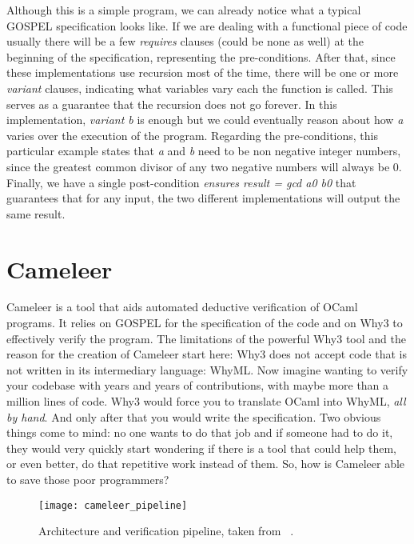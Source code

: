 Although this is a simple program, we can already notice what a typical GOSPEL specification looks like.
If we are dealing with a functional piece of code usually there will be a few \emph{requires} clauses (could be none as well) at the beginning of the specification, representing the pre-conditions.
After that, since these implementations use recursion most of the time, there will be one or more \emph{variant} clauses, indicating what variables vary each the function is called.
This serves as a guarantee that the recursion does not go forever.
In this implementation, \emph{variant b} is enough but we could eventually reason about how \emph{a} varies over the execution of the program. 
Regarding the pre-conditions, this particular example states that \emph{a} and \emph{b} need to be non negative integer numbers, since the greatest common divisor of any two negative numbers will always be 0.
Finally, we have a single post-condition \emph{ensures result = gcd a0 b0} that guarantees that for any input, the two different implementations will output the same result. 


\section{Cameleer}
\label{sec:cameleer}

Cameleer is a tool that aids automated deductive verification of OCaml programs.
It relies on GOSPEL for the specification of the code and on Why3 to effectively verify the program.
The limitations of the powerful Why3 tool and the reason for the creation of Cameleer start here: Why3 does not accept code that is not written in its intermediary language: WhyML.
Now imagine wanting to verify your codebase with years and years of contributions, with maybe more than a million lines of code.
Why3 would force you to translate OCaml into WhyML, \emph{all by hand}. 
And only after that you would write the specification.
Two obvious things come to mind: no one wants to do that job and if someone had to do it, they would very quickly start wondering if there is a tool that could help them, or even better, do that repetitive work instead of them.
So, how is Cameleer able to save those poor programmers?

\begin{figure}[htbp]
  \centering
  \texttt{[image: cameleer\_pipeline]}
  \caption{Architecture and verification pipeline, taken from ~\cite{DBLP:conf/cav/PereiraR20}.}
  \label{fig:cameleer_pipeline}
\end{figure}

